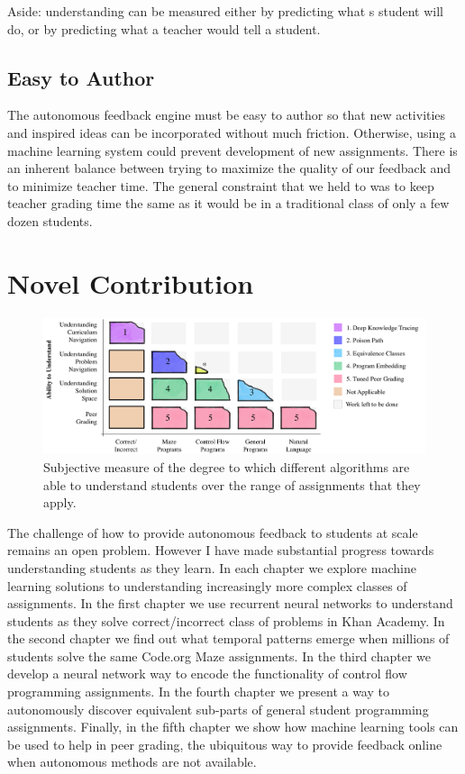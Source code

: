 Aside: understanding can be measured either by predicting what s student will do, or by predicting what a teacher would tell a student.

\subsection{Easy to Author}

The autonomous feedback engine must be easy to author so that new activities and inspired ideas can be incorporated without much friction. Otherwise, using a machine learning system could prevent development of new assignments. There is an inherent balance between trying to maximize the quality of our feedback and to minimize teacher time. The general constraint that we held to was to keep teacher grading time the same as it would be in a traditional class of only a few dozen students.

\section{Novel Contribution}

\begin{figure}[t]
\center
   \includegraphics[width=1.0\textwidth]{img/intro-blocks.pdf}
\caption[Subjective contribution overview]{
Subjective measure of the degree to which different algorithms are able to understand students over the range of assignments that they apply.}
\label{fig:bigPicture}

\end{figure}

The challenge of how to provide autonomous feedback to students at scale remains an open problem. However I have made substantial progress towards understanding students as they learn. In each chapter we explore machine learning solutions to understanding increasingly more complex classes of assignments. 
In the first chapter we use recurrent neural networks to understand students as they solve correct/incorrect class of problems in Khan Academy. In the second chapter we find out what temporal patterns emerge when millions of students solve the same Code.org Maze assignments. In the third chapter we develop a neural network way to encode the functionality of control flow programming assignments. In the fourth chapter we present a way to autonomously discover equivalent sub-parts of general student programming assignments. Finally, in the fifth chapter we show how machine learning tools can be used to help in peer grading, the ubiquitous way to provide feedback online when autonomous methods are not available.

